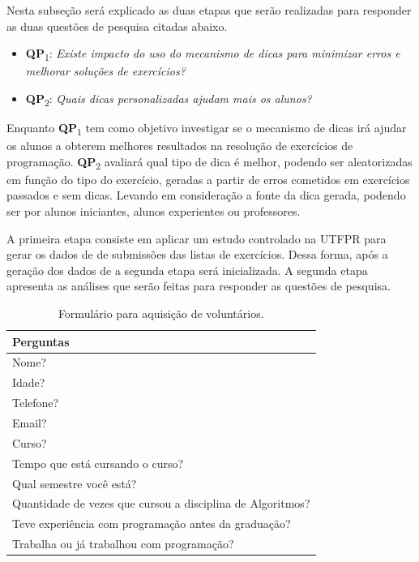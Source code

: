 Nesta subseção será explicado as duas etapas que serão realizadas para responder as duas questões de pesquisa citadas abaixo.

\begin{itemize}
	\item \textbf{QP}\textsubscript{1}: 
	\textit{Existe impacto do uso do mecanismo de dicas para minimizar erros e melhorar soluções de exercícios?}
	
	\item \textbf{QP}\textsubscript{2}: 
	\textit{Quais dicas personalizadas ajudam mais os alunos?}
\end{itemize}

Enquanto \textbf{QP}\textsubscript{1} tem como objetivo investigar se o mecanismo de dicas irá ajudar os alunos a obterem melhores resultados na resolução de exercícios de programação. \textbf{QP}\textsubscript{2} avaliará qual tipo de dica é melhor, podendo ser aleatorizadas em função do tipo do exercício, geradas a partir de erros cometidos em exercícios passados e sem dicas. Levando em consideração a fonte da dica gerada, podendo ser por alunos iniciantes, alunos experientes ou professores.

A primeira etapa consiste em aplicar um estudo controlado na UTFPR para gerar os dados de  de submissões das listas de exercícios. Dessa forma, após a geração dos dados de  a segunda etapa será inicializada. A segunda etapa apresenta as análises que serão feitas para responder as questões de pesquisa.

\begin{table}[]
	\centering
	\captionsetup{justification=centering}
	\caption{Formulário para aquisição de voluntários.}
	\label{tabela:formulário}
	\begin{tabular}{l}
		\hline
		Perguntas                        \\ \hline
		Nome?                            \\
		Idade?                           \\
		Telefone?                        \\
		Email?                           \\
		Curso?                           \\
		Tempo que está cursando o curso? \\
		Qual semestre você está?         \\ 
		Quantidade de vezes que cursou a disciplina de Algoritmos?  \\ 
		Teve experiência com programação antes da graduação? \\
		Trabalha ou já trabalhou com programação? \\ \hline
	\end{tabular}
\end{table}

